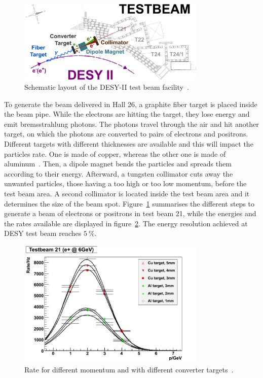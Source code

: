     \begin{figure}[!h]
      \centering
      \includegraphics[width = 0.8\textwidth]{Pictures/X0/desy_tb-sketch.png}
      \caption{Schematic layout of the DESY-II test beam facility~\cite{DESYII}.}
      \label{fig:desyTb-sketch}
    \end{figure}

    To generate the beam delivered in Hall 26, a graphite fiber target is placed inside the beam pipe.
    While the electrons are hitting the target, they lose energy and emit bremsstrahlung photons.
    The photons travel through the air and hit another target, on which the photons are converted to pairs of electrons and positrons.
    Different targets with different thicknesses are available and this will impact the particles rate.
    One is made of copper, whereas the other one is made of aluminum~\cite{ConversionTargets}.
    Then, a dipole magnet bends the particles and spreads them according to their energy.
    Afterward, a tungsten collimator cuts away the unwanted particles, those having a too high or too low momentum, before the test beam area.
    A second collimator is located inside the test beam area and it determines the size of the beam spot.
    Figure~\ref{fig:desyTb-sketch} summarises the different steps to generate a beam of electrons or positrons in test beam 21, while the energies and the rates available are displayed in figure~\ref{fig:rateTB21}.
    The energy resolution achieved at \gls{DESY} test beam reaches $5~\%$.

    \begin{figure}[!h]
      \centering
      \includegraphics[width = 0.8\textwidth]{Pictures/X0/rate_vs_p_t21.png}
      \caption{Rate for different momentum and with different converter targets~\cite{DESYII}.}
      \label{fig:rateTB21}
    \end{figure}

